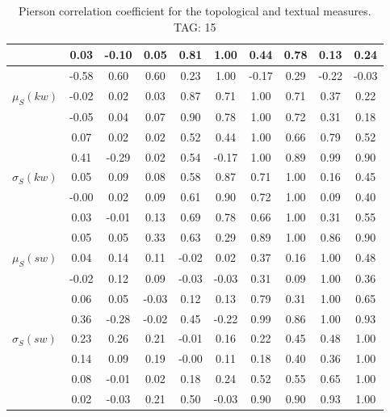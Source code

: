 \begin{table*}[h!]
\begin{center}
\begin{tabular}{| l | c | c | c | c | c | c | c | c | c |}
 & 0.03  & -0.10  & 0.05  & 0.81  & 1.00  & 0.44  & 0.78  & 0.13  & 0.24 \\\hline
 & -0.58  & 0.60  & 0.60  & 0.23  & 1.00  & -0.17  & 0.29  & -0.22  & -0.03 \\\hline
$\mu_S(kw)$ & -0.02  & 0.02  & 0.03  & 0.87  & 0.71  & 1.00  & 0.71  & 0.37  & 0.22 \\\hline
 & -0.05  & 0.04  & 0.07  & 0.90  & 0.78  & 1.00  & 0.72  & 0.31  & 0.18 \\\hline
 & 0.07  & 0.02  & 0.02  & 0.52  & 0.44  & 1.00  & 0.66  & 0.79  & 0.52 \\\hline
 & 0.41  & -0.29  & 0.02  & 0.54  & -0.17  & 1.00  & 0.89  & 0.99  & 0.90 \\\hline
$\sigma_S(kw)$ & 0.05  & 0.09  & 0.08  & 0.58  & 0.87  & 0.71  & 1.00  & 0.16  & 0.45 \\\hline
 & -0.00  & 0.02  & 0.09  & 0.61  & 0.90  & 0.72  & 1.00  & 0.09  & 0.40 \\\hline
 & 0.03  & -0.01  & 0.13  & 0.69  & 0.78  & 0.66  & 1.00  & 0.31  & 0.55 \\\hline
 & 0.05  & 0.05  & 0.33  & 0.63  & 0.29  & 0.89  & 1.00  & 0.86  & 0.90 \\\hline
$\mu_S(sw)$ & 0.04  & 0.14  & 0.11  & -0.02  & 0.02  & 0.37  & 0.16  & 1.00  & 0.48 \\\hline
 & -0.02  & 0.12  & 0.09  & -0.03  & -0.03  & 0.31  & 0.09  & 1.00  & 0.36 \\\hline
 & 0.06  & 0.05  & -0.03  & 0.12  & 0.13  & 0.79  & 0.31  & 1.00  & 0.65 \\\hline
 & 0.36  & -0.28  & -0.02  & 0.45  & -0.22  & 0.99  & 0.86  & 1.00  & 0.93 \\\hline
$\sigma_S(sw)$ & 0.23  & 0.26  & 0.21  & -0.01  & 0.16  & 0.22  & 0.45  & 0.48  & 1.00 \\\hline
 & 0.14  & 0.09  & 0.19  & -0.00  & 0.11  & 0.18  & 0.40  & 0.36  & 1.00 \\\hline
 & 0.08  & -0.01  & 0.02  & 0.18  & 0.24  & 0.52  & 0.55  & 0.65  & 1.00 \\\hline
 & 0.02  & -0.03  & 0.21  & 0.50  & -0.03  & 0.90  & 0.90  & 0.93  & 1.00 \\\hline
\end{tabular}
\caption{Pierson correlation coefficient for the topological and textual measures. TAG: 15}
\end{center}
\end{table*}